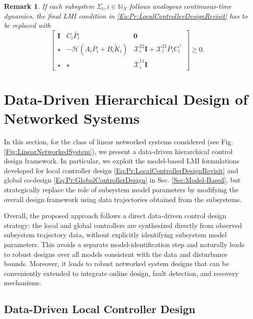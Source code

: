 \documentclass[letterpaper, 10 pt, conference]{ieeeconf}%
\newcommand{\N}{\mathbb{N}}
\newcommand{\T}{\top}
\newcommand{\I}{\mathbf{I}}
\newcommand{\0}{\mathbf{0}}
\newcommand{\X}{\mathcal{X}}
\newcommand{\x}{{\scriptstyle \X}}
\newcommand{\bm}[1]{\begin{bmatrix}#1\end{bmatrix}}
\newtheorem{remark}{\textbf{Remark}}
\begin{document}
\begin{remark}
If each subsystem $\Sigma_i, i\in\N_N$ follows analogous continuous-time dynamics, the final LMI condition in  \eqref{Eq:Pr:LocalControllerDesignRevisit} has to be replaced with
\begin{equation}
\bm{
\I & C_i\bar{P}_i & \0 \\
\star & -\mathcal{H}(A_i \bar{P}_i + B_i \tilde{K}_i) & \x_i^{22}\I +  \x^{21}_i \bar{P}_i C_i^\T \\
\star & \star & \bar{\x}^{11}_i \I 
}  \geq 0.
\end{equation}
\end{remark}

\section{Data-Driven Hierarchical Design of Networked Systems}
\label{Sec:Data-Driven}

In this section, for the class of linear networked systems considered (see Fig. \ref{Fig:LinearNetworkedSystem}), we present a data-driven hierarchical control design framework. In particular, we exploit the model-based LMI formulations developed for local controller design \eqref{Eq:Pr:LocalControllerDesignRevisit} and global co-design \eqref{Eq:Pr:GlobalControllerDesign} in Sec. \ref{Sec:Model-Based}, but strategically replace the role of subsystem model parameters by modifying the overall design framework using data trajectories obtained from the subsystems. 

Overall, the proposed approach follows a direct data-driven control design strategy: the local and global controllers are synthesized directly from observed subsystem trajectory data, without explicitly identifying subsystem model parameters. This avoids a separate model-identification step and naturally leads to robust designs over all models consistent with the data and disturbance bounds. Moreover, it leads to robust networked system designs that can be conveniently extended to integrate online design, fault detection, and recovery mechanisms. 

\subsection{Data-Driven Local Controller Design}
\end{document}
